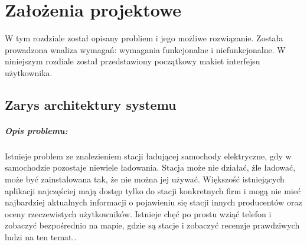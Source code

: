 \chapter{Założenia projektowe}
W tym rozdziale został opisany probliem i jego możliwe rozwiązanie.
Została prowadzona wnaliza wymagań: wymagania funkcjonalne i niefunkcjonalne.
W niniejszym rozdiale został przedstawiony początkowy makiet interfejsu użytkownika.

\section{Zarys architektury systemu}



\paragraph{Opis problemu:}
Istnieje problem ze znalezieniem stacji ładującej samochody elektryczne, gdy w samochodzie pozostaje niewiele ładowania.
Stacja może nie działać, źle ładować, może być zainstalowana tak, że nie można jej używać.
Większość istniejących aplikacji najczęściej mają dostęp tylko do stacji konkretnych firm i mogą nie mieć najbardziej aktualnych informacji o pojawieniu się stacji innych producentów oraz oceny rzeczewistych użytkowników.
Istnieje chęć po prostu wziąć telefon i zobaczyć bezpośrednio na mapie, gdzie są stacje i zobaczyć recenzje prawdziwych ludzi na ten temat..

